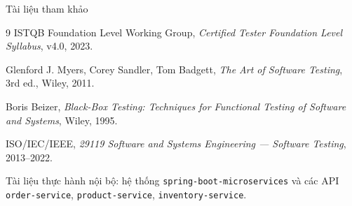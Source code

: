 \documentclass[aspectratio=169,12pt]{beamer}
\begin{document}
\begin{frame}[shrink=8]{Tài liệu tham khảo}
  \begin{thebibliography}{9}
    ISTQB Foundation Level Working Group,
    \textit{Certified Tester Foundation Level Syllabus}, v4.0, 2023.

    Glenford J. Myers, Corey Sandler, Tom Badgett,
    \textit{The Art of Software Testing}, 3rd ed., Wiley, 2011.

    Boris Beizer,
    \textit{Black-Box Testing: Techniques for Functional Testing of Software and Systems}, Wiley, 1995.

    ISO/IEC/IEEE,
    \textit{29119 Software and Systems Engineering --- Software Testing}, 2013--2022.

    Tài liệu thực hành nội bộ: hệ thống \texttt{spring-boot-microservices}
    và các API \texttt{order-service}, \texttt{product-service}, \texttt{inventory-service}.
  \end{thebibliography}
\end{frame}

\end{document}
